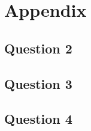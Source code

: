 \newpage
\section{Appendix}

\subsection{Question 2}





\newpage
\subsection{Question 3}



\newpage
\subsection{Question 4}





